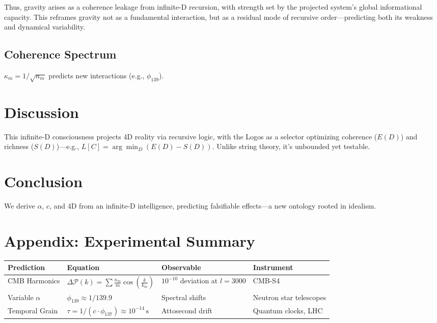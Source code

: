 \documentclass[12pt]{article}
\begin{document}
Thus, gravity arises as a coherence leakage from infinite-D recursion, with strength set by the projected system’s global informational capacity. This reframes gravity not as a fundamental interaction, but as a residual mode of recursive order—predicting both its weakness and dynamical variability.

\subsection{Coherence Spectrum}
\(\kappa_m = 1/\sqrt{n_m}\) predicts new interactions (e.g., \(\phi_{139}\)).

\section{Discussion}

This infinite-D consciousness projects 4D reality via recursive logic, with the Logos as a selector optimizing coherence (\(E(D)\)) and richness (\(S(D)\))—e.g., \(L[C] = \arg\min_D (E(D) - S(D))\). Unlike string theory, it’s unbounded yet testable.

\section{Conclusion}

We derive \(\alpha\), \(c\), and 4D from an infinite-D intelligence, predicting falsifiable effects—a new ontology rooted in idealism.

\section*{Appendix: Experimental Summary}
\begin{tabularx}{\textwidth}{|l|X|l|l|}
\hline
\textbf{Prediction} & \textbf{Equation} & \textbf{Observable} & \textbf{Instrument} \\
\hline
CMB Harmonics & \(\Delta \mathcal{P}(k) = \sum \frac{\kappa_m}{m} \cos\left(\frac{k}{k_m}\right)\) & \(10^{-10}\) deviation at \(l = 3000\) & CMB-S4 \\
\hline
Variable \(\alpha\) & \(\phi_{139} \approx 1/139.9\) & Spectral shifts & Neutron star telescopes \\
\hline
Temporal Grain & \(\tau = 1/(c \cdot \phi_{137}) \approx 10^{-14} \, \text{s}\) & Attosecond drift & Quantum clocks, LHC \\
\hline
\end{tabularx}
\end{document}
